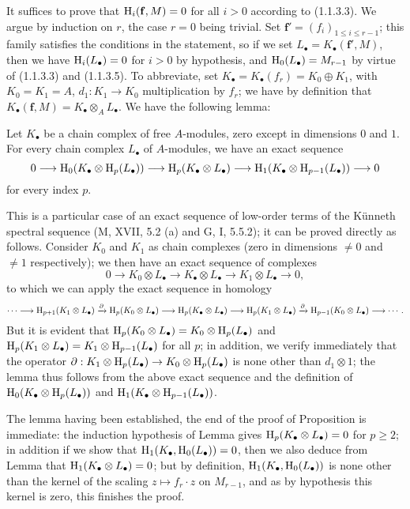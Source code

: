 It suffices to prove that $\mathrm{H}_i(\mathbf{f},M)=0$ for all $i>0$ according to (1.1.3.3).
We argue by induction on $r$, the case $r=0$ being trivial.
Set $\mathbf{f}'=(f_i)_{1\leq i\leq r-1}$; this family satisfies the conditions in the statement, so if we set $L_\bullet=K_\bullet(\mathbf{f}',M)$, then we have $\mathrm{H}_i(L_\bullet)=0$ for $i>0$ by hypothesis, and $\mathrm{H}_0(L_\bullet)=M_{r-1}$ by virtue of (1.1.3.3) and (1.1.3.5).
To abbreviate, set $K_\bullet=K_\bullet(f_r)=K_0\oplus K_1$, with $K_0=K_1=A$, $d_1:K_1\to K_0$ multiplication by $f_r$; we have by definition  that $K_\bullet(\mathbf{f},M)=K_\bullet\otimes_A L_\bullet$.
We have the following lemma:

\begin{lemma}[1.1.4.1]
\label{III.1.1.4.1}
Let $K_\bullet$ be a chain complex of free $A$-modules, zero except in dimensions $0$ and $1$.
For every chain complex $L_\bullet$ of $A$-modules, we have an exact sequence
\[
  0\to\HH_0(K_\bullet\otimes\HH_p(L_\bullet))\to\HH_p(K_\bullet\otimes L_\bullet)\to\HH_1(K_\bullet\otimes\HH_{p-1}(L_\bullet))\to 0
\]
for every index $p$.
\end{lemma}

This is a particular case of an exact sequence of low-order terms of the K\"unneth spectral sequence (M, XVII, 5.2 (a) and G, I, 5.5.2); it can be proved directly as follows.
Consider $K_0$ and $K_1$ as chain complexes (zero in dimensions $\neq 0$ and $\neq 1$ respectively); we then have an exact sequence of complexes
\[
  0\to K_0\otimes L_\bullet\to K_\bullet\otimes L_\bullet\to K_1\otimes L_\bullet\to 0,
\]
to which we can apply the exact sequence in homology
\[
  \cdots\to\HH_{p+1}(K_1\otimes L_\bullet)\xrightarrow{\partial}\HH_p(K_0\otimes L_\bullet)\to\HH_p(K_\bullet\otimes L_\bullet)\to\HH_p(K_1\otimes L_\bullet)\xrightarrow{\partial}\HH_{p-1}(K_0\otimes L_\bullet)\to\cdots.
\]
But it is evident that $\mathrm{H}_p(K_0\otimes L_\bullet)=K_0\otimes\mathrm{H}_p(L_\bullet)$ and $\mathrm{H}_p(K_1\otimes L_\bullet)=K_1\otimes\mathrm{H}_{p-1}(L_\bullet)$ for all $p$; in addition, we verify immediately that the operator $\partial:K_1\otimes\HH_p(L_\bullet)\to K_0\otimes\HH_p(L_\bullet)$ is none other than $d_1\otimes 1$; the lemma thus follows from the above exact sequence and the definition of $\mathrm{H}_0(K_\bullet\otimes\mathrm{H}_p(L_\bullet))$ and $\mathrm{H}_1(K_\bullet\otimes\mathrm{H}_{p-1}(L_\bullet))$.

The lemma having been established, the end of the proof of Proposition  is immediate: the induction hypothesis of Lemma  gives $\mathrm{H}_p(K_\bullet\otimes L_\bullet)=0$ for $p\geq 2$; in addition if we show that $\mathrm{H}_1(K_\bullet,\mathrm{H}_0(L_\bullet))=0$, then we also deduce from Lemma  that $\mathrm{H}_1(K_\bullet\otimes L_\bullet)=0$; but by definition, $\mathrm{H}_1(K_\bullet,\mathrm{H}_0(L_\bullet))$ is none other than the kernel of the scaling $z\mapsto f_r\cdot z$ on $M_{r-1}$, and as by hypothesis this kernel is zero, this finishes the proof.

